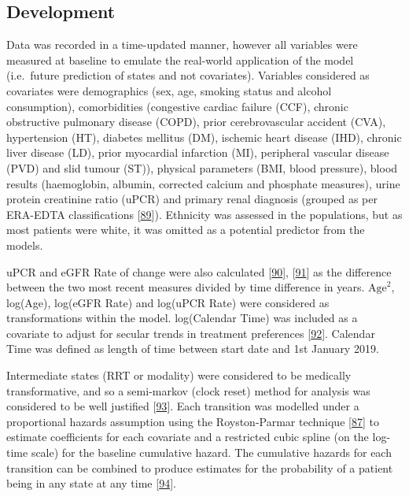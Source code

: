 \documentclass[12pt,PhD,twoside,openright]{muthesis}
\begin{document}
\hypertarget{development}{%
\subsection{Development}\label{development}}

Data was recorded in a time-updated manner, however all variables were measured at baseline to emulate the real-world application of the model (i.e.~future prediction of states and not covariates). Variables considered as covariates were demographics (sex, age, smoking status and alcohol consumption), comorbidities (congestive cardiac failure (CCF), chronic obstructive pulmonary disease (COPD), prior cerebrovascular accident (CVA), hypertension (HT), diabetes mellitus (DM), ischemic heart disease (IHD), chronic liver disease (LD), prior myocardial infarction (MI), peripheral vascular disease (PVD) and slid tumour (ST)), physical parameters (BMI, blood pressure), blood results (haemoglobin, albumin, corrected calcium and phosphate measures), urine protein creatinine ratio (uPCR) and primary renal diagnosis (grouped as per ERA-EDTA classifications {[}\protect\hyperlink{ref-venkat-raman_new_2012}{89}{]}). Ethnicity was assessed in the populations, but as most patients were white, it was omitted as a potential predictor from the models.

uPCR and eGFR Rate of change were also calculated {[}\protect\hyperlink{ref-kovesdy_past_2016}{90}{]}, {[}\protect\hyperlink{ref-naimark_past_2016}{91}{]} as the difference between the two most recent measures divided by time difference in years. \(\textrm{Age}^2\), log(Age), log(eGFR Rate) and log(uPCR Rate) were considered as transformations within the model. log(Calendar Time) was included as a covariate to adjust for secular trends in treatment preferences {[}\protect\hyperlink{ref-bhatnagar_epidemiology_2015}{92}{]}. Calendar Time was defined as length of time between start date and 1st January 2019.

Intermediate states (RRT or modality) were considered to be medically transformative, and so a semi-markov (clock reset) method for analysis was considered to be well justified {[}\protect\hyperlink{ref-meira-machado_multi-state_2009}{93}{]}. Each transition was modelled under a proportional hazards assumption using the Royston-Parmar technique {[}\protect\hyperlink{ref-royston_flexible_2002}{87}{]} to estimate coefficients for each covariate and a restricted cubic spline (on the log-time scale) for the baseline cumulative hazard. The cumulative hazards for each transition can be combined to produce estimates for the probability of a patient being in any state at any time {[}\protect\hyperlink{ref-putter_tutorial_2007}{94}{]}.
\end{document}
